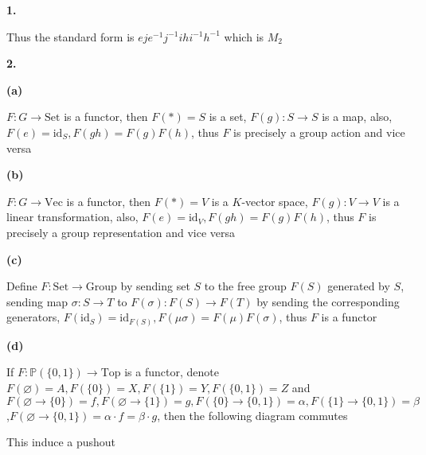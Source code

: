 \documentclass[../main.tex]{subfiles}
\begin{document}
\textbf{1.} \par
\vspace{13cm}
Thus the standard form is $eje^{-1}j^{-1}ihi^{-1}h^{-1}$ which is $M_2$ \par
\textbf{2.} \par
\textbf{(a)} \par
$F:G\rightarrow\mathrm{Set}$ is a functor, then $F(*)=S$ is a set, $F(g):S\rightarrow S$ is a map, also, $F(e)=\mathrm{id}_S, F(gh)=F(g)F(h)$, thus $F$ is precisely a group action and vice versa \par
\textbf{(b)} \par
$F:G\rightarrow\mathrm{Vec}$ is a functor, then $F(*)=V$ is a $K$-vector space, $F(g):V\rightarrow V$ is a linear transformation, also, $F(e)=\mathrm{id}_V, F(gh)=F(g)F(h)$, thus $F$ is precisely a group representation and vice versa \par
\textbf{(c)} \par
Define $F:\mathrm{Set}\rightarrow\mathrm{Group}$ by sending set $S$ to the free group $F(S)$ generated by $S$, sending map $\sigma:S\rightarrow T$ to $F(\sigma):F(S)\rightarrow F(T)$ by sending the corresponding generators, $F(\mathrm{id}_S)=\mathrm{id}_{F(S)},F(\mu\sigma)=F(\mu)F(\sigma)$, thus $F$ is a functor \par
\textbf{(d)} \par
If $F:\mathbb{P}(\{0,1\})\rightarrow \mathrm{Top}$ is a functor, denote $F(\varnothing)=A,F(\{0\})=X,F(\{1\})=Y,F(\{0,1\})=Z$ and $F(\varnothing\rightarrow\{0\})=f,F(\varnothing\rightarrow\{1\})=g,F(\{0\}\rightarrow\{0,1\})=\alpha,F(\{1\}\rightarrow\{0,1\})=\beta$,$F(\varnothing\rightarrow\{0,1\})=\alpha\cdot f=\beta\cdot g$, then the following diagram commutes \par
\begin{center}
\end{center}
This induce a pushout \par
\begin{center}
\end{center}
\end{document}
